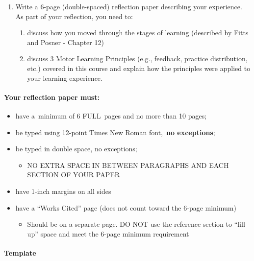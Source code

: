 \documentclass[
  letterpaper,
  DIV=11,
  numbers=noendperiod]{scrartcl}
\let\oldparagraph\paragraph
\renewcommand{\paragraph}[1]{\oldparagraph{#1}\mbox{}}
\providecommand{\tightlist}{%
  \setlength{\itemsep}{0pt}\setlength{\parskip}{0pt}}\usepackage{longtable,booktabs,array}
\begin{document}
\begin{enumerate}
\def\labelenumi{\arabic{enumi}.}
\item
  Write a 6-page (double-spaced) reflection paper describing your
  experience. As part of your reflection, you need to:

  \begin{enumerate}
  \def\labelenumii{\arabic{enumii}.}
  \item
    discuss how you moved through the stages of learning (described by
    Fitts and Posner - Chapter 12)
  \item
    discuss 3 Motor Learning Principles (e.g., feedback, practice
    distribution, etc.) covered in this course and explain how the
    principles were applied to your learning experience.
  \end{enumerate}
\end{enumerate}

\hypertarget{your-reflection-paper-must}{%
\paragraph{Your reflection paper
must:}\label{your-reflection-paper-must}}

\begin{itemize}
\tightlist
\item
  have a~minimum of 6 FULL~pages and no more than 10 pages;
\item
  be typed using 12-point Times New Roman font,~\textbf{no exceptions};
\item
  be typed in double space, no exceptions;

  \begin{itemize}
  \tightlist
  \item
    NO EXTRA SPACE IN BETWEEN PARAGRAPHS AND EACH SECTION OF YOUR PAPER
  \end{itemize}
\item
  have 1-inch margins on all sides
\item
  have a ``Works Cited'' page (does not count toward the 6-page minimum)

  \begin{itemize}
  \tightlist
  \item
    Should be on a separate page. DO NOT use the reference section to
    ``fill up'' space and meet the 6-page minimum requirement
  \end{itemize}
\end{itemize}

\hypertarget{template}{%
\paragraph{Template}\label{template}}
\end{document}
